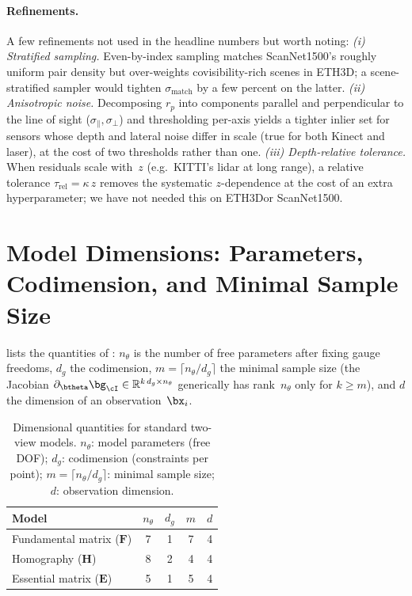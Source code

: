 \documentclass{article}
\newcommand{\Reals}{\mathbb{R}}
\newcommand{\mname}[1]{\texorpdfstring{#1\xspace}{#1}}
\newcommand{\ethd}{\mname{ETH3D}}
\begin{document}
		\paragraph{Refinements.}
		A few refinements not used in the headline numbers but worth
		noting:
		\emph{(i) Stratified sampling.}  Even-by-index sampling
		matches ScanNet1500's roughly uniform pair density but
		over-weights covisibility-rich scenes in \ethd; a
		scene-stratified sampler would tighten $\sigma_{\mathrm{match}}$
		by a few percent on the latter.
		\emph{(ii) Anisotropic noise.}  Decomposing $r_p$ into
		components parallel and perpendicular to the line of sight
		($\sigma_\parallel,\sigma_\perp$) and thresholding per-axis
		yields a tighter inlier set for sensors whose depth and
		lateral noise differ in scale (true for both Kinect and laser),
		at the cost of two thresholds rather than one.
		\emph{(iii) Depth-relative tolerance.}  When residuals scale
		with~$z$ (e.g.\ KITTI's lidar at long range), a relative
		tolerance $\tau_{\mathrm{rel}} = \kappa\,z$ removes the systematic
	$z$-dependence at the cost of an extra hyperparameter; we have
		not needed this on \ethd or ScanNet1500.
		\fi  %



		\section{Model Dimensions: Parameters, Codimension, and Minimal Sample Size}
		\label{sec:supp-dims}

 lists the quantities of :
$n_\theta$ is the number of free parameters after fixing gauge
freedoms, $d_g$ the codimension, $m = \lceil n_\theta/d_g\rceil$ the
minimal sample size (the Jacobian
$\pdv{\bg_\cI}!{\btheta} \in \Reals^{k\,d_g \times n_\theta}$ generically
has rank~$n_\theta$ only for $k \ge m$), and $d$ the dimension of an
observation~$\bx_i$.

\begin{table}[ht]
	\centering
	\caption{Dimensional quantities for standard two-view models.
		$n_\theta$: model parameters (free DOF);
		$d_g$: codimension (constraints per point);
		$m = \lceil n_\theta/d_g\rceil$: minimal sample size;
		$d$: observation dimension.}
	\label{tab:model-dims}
	\smallskip
	\begin{tabular}{lcccc}
		\toprule
		\textbf{Model}                    & $n_\theta$ & $d_g$ & $m$ & $d$ \\
		\midrule
		Fundamental matrix ($\mathbf{F}$) & 7          & 1     & 7   & 4   \\
		Homography ($\mathbf{H}$)         & 8          & 2     & 4   & 4   \\
		Essential matrix ($\mathbf{E}$)   & 5          & 1     & 5   & 4   \\
		\bottomrule
	\end{tabular}
\end{table}
\end{document}
